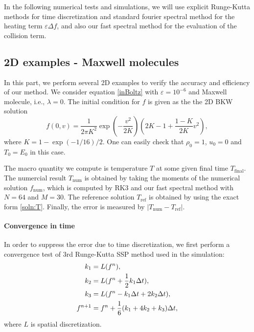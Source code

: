 \documentclass[review, times]{elsarticle}
\begin{document}
In the following numerical tests and simulations, we will use explicit Runge-Kutta methods for time discretization and standard fourier spectral method for the heating term $\varepsilon\Delta f$, and also our fast spectral method for the evaluation of the collision term.

\subsection{2D examples - Maxwell molecules}

In this part, we perform several 2D examples to verify the accuracy and efficiency of our method. We consider equation \eqref{inBoltz} with $\varepsilon = 10^{-6}$ and Maxwell molecule, i.e., $\lambda = 0$. The initial condition for $f$ is given as the the 2D BKW solution
\begin{equation} \label{ext1}
  f(0,v) = \frac{1}{2\pi K^2}\exp\left(-\frac{v^2}{2K}\right)\left(2K-1+\frac{1-K}{2K}v^2\right),
\end{equation}
where $K=1-\exp(-1/16)/2$. One can easily check that $\rho_0 = 1$, $u_0 = 0$ and $T_0 = E_0$ in this case.

The macro quantity we compute is temperature $T$ at some given final time $T_\text{final}$. The numercial result $T_\text{num}$ is obtained by taking the moments of the numerical solution $f_\text{num}$, which is computed by RK3 and our fast spectral method with $N = 64$ and $M = 30$. The reference solution $T_\text{ref}$ is obtained by using the exact form \eqref{soln:T}. Finally, the error is measured by $|T_\text{num} - T_\text{ref}|$.


\paragraph{\bf Convergence in time} In order to suppress the error due to time discretization, we first perform a convergence test of 3rd Runge-Kutta SSP method used in the simulation:
\begin{align}
  k_1 &= L(f^n), \notag \\
  k_2 &= L(f^n + \frac{1}{2}k_1\Delta t), \notag \\
  k_3 &= L(f^n - k_1\Delta t + 2k_2\Delta t), \notag \\
  f^{n+1} &= f^n + \frac{1}{6}(k_1 + 4k_2 + k_3)\Delta t,
\end{align}
where $L$ is spatial discretization.
\end{document}

